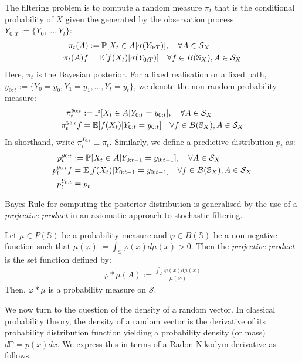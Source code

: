 \begin{defn}
The filtering problem is to compute a random measure $\pi_t$ that is the conditional probability of  $X$ given the \ofield{} generated by the observation process $Y_{0:T}:=\{Y_0, \hdots, Y_t \}$:
\begin{align}
\pi_t(A) &:= \mathbb{P}_{{}}{[X_t \in A | \sigma(Y_{0:T})]}, \quad \forall A \in \mathcal{S}_X \\
\pi_t(A) f &= \mathbb{E}[f(X_t) |  \sigma(Y_{0:T})] \quad \forall f \in B(\mathbb{S}_X), A \in \mathcal{S}_X 
\end{align} Here, $\pi_t$ is the Bayesian posterior. For a fixed realisation or a fixed path, $y_{0:t} := \{Y_0 = y_0, Y_1 =y_1, \hdots, Y_t = y_t \}$, we denote the non-random probability measure:
\begin{align}
\pi_t^{y_{0:t}} &:=  \mathbb{P}_{{}}{[X_t \in A | Y_{0:t} =y_{0:t} ]}, \quad \forall A \in \mathcal{S}_X \\
\pi_t^{y_{0:t}}f  & =  \mathbb{E}[f(X_t) |  Y_{0:t} =y_{0:t}] \quad \forall f \in B(\mathbb{S}_X), A \in \mathcal{S}_X 
\end{align} In shorthand, write  $\pi_t^{Y_{0:t}} \equiv \pi_t$. 
Similarly, we define a predictive distribution $p_t$ as:
\begin{align}
p_t^{y_{0:t}} & := \mathbb{P}_{{}}{[X_t \in A | Y_{0:t-1} =y_{0:t-1} ]}, \quad \forall A \in \mathcal{S}_X \\
p_t^{y_{0:t}}f  & =  \mathbb{E}[f(X_t) |  Y_{0:t-1} =y_{0:t-1}] \quad \forall f \in B(\mathbb{S}_X), A \in \mathcal{S}_X \\
p_t^{Y_{0:t}} & \equiv p_t
\end{align}
\end{defn}
Bayes Rule for computing the posterior distribution is generalised by the use of a \textit{projective product }in an axiomatic approach to stochastic filtering. 
\begin{defn}
	Let $\mu \in P(\mathbb{S})$ be a probability measure and $\varphi \in B(\mathbb{S})$ be a non-negative function such that $\mu(\varphi) := \int_{\mathbb{S}} \varphi(x) d\mu(x)  > 0 $. Then the \textit{projective product} is the {\color{red} set function} defined by:
	\begin{align}
	\varphi * \mu(A) :=\frac{\int_A \varphi(x) d\mu(x) }{\mu(\varphi)}
	\end{align}
	Then, $\varphi * \mu$ is a probability measure on $\mathcal{S}$.
\end{defn}
We now turn to the question of the density of a random vector. In classical probability theory, the density of a random vector is the derivative of its probability distribution function yielding a probability density (or mass) $d\mathbb{P} = p(x) dx $. We express this in terms of a Radon-Nikodym derivative as follows.

